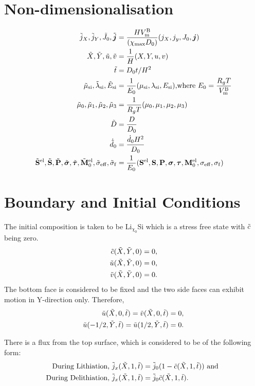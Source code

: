 \section{Non-dimensionalisation}
\begin{align}
    \tilde{j}_X, \tilde{j}_Y, \tilde{J}_0, \tilde{\bm{j}} &=  \frac{H V_{\rm{m}}^{\rm{B}}}{(\chi_{{\rm{max}}} D_0)} (j_X, j_y, J_0, \bm{j}) \\
    \tilde{X}, \tilde{Y}, \tilde{u}, \tilde{v} &= \frac{1}{H}(X, Y, u, v) \\
    \tilde{t} &= D_0 t/H^2 \\
     \tilde{\mu}_{\text{si}}, \tilde{\lambda}_{\text{si}}, \tilde{E}_{\text{si}} &= \frac{1}{E_0} (\mu_{\text{si}}, \lambda_{\text{si}}, E_{\text{si}}) 
     \text{,where }  E_0 = \frac{R_g T}{V_{\rm{m}}^{\rm{B}}} \\
     \tilde{\mu}_0, \tilde{\mu}_1, \tilde{\mu}_2, \tilde{\mu}_3 &= \frac{1}{R_g T}(\mu_0, \mu_1, \mu_2, \mu_3) \\
     \tilde{D} &= \frac{D}{D_0} \\
     \dot{\tilde{d}}_{0} &= \frac{{\dot{d}}_0 H^2}{D_0} \\
     \tilde{\mathbf{S}}^{{\rm{el}}}, \tilde{\mathbf{S}}, \tilde{\mathbf{P}}, \tilde{\bm{\sigma}}, \tilde{\bm{\tau}}, \tilde{\mathbf{M}}^{{\rm{el}}}_{0}, \tilde{\sigma}_{\rm{eff}}, \tilde{\sigma}_{\rm{f}} &= \frac{1}{E_0}(\mathbf{S}^{{\rm{el}}}, \mathbf{S}, \mathbf{P}, \bm{\sigma}, \bm{\tau}, \mathbf{M}^{{\rm{el}}}_{0}, \sigma_{\rm{eff}}, \sigma_{\rm{f}})
\end{align}


\section{Boundary and Initial Conditions}
The initial composition is taken to be Li$_{\chi_{0}}$Si which is a stress free state with $\tilde{c}$ being zero.
\begin{align}
    \tilde{c}(\tilde{X}, \tilde{Y}, 0) = 0, \\
    \tilde{u}(\tilde{X}, \tilde{Y}, 0) = 0,\\
    \tilde{v}(\tilde{X}, \tilde{Y}, 0) = 0.
\end{align}
\clearpage
The bottom face is considered to be fixed and the two side faces can exhibit motion in Y-direction only. Therefore,
\begin{align}
    \tilde{u}(\tilde{X}, 0, \tilde{t}) = \tilde{v}(\tilde{X}, 0, \tilde{t}) = 0, \\
    \tilde{u}(-1/2, \tilde{Y}, \tilde{t}) =  \tilde{u}(1/2, \tilde{Y}, \tilde{t}) = 0.
\end{align}

There is a flux from the top surface, which is considered to be of the following form: 
\begin{align}
    \text{During Lithiation, }\tilde{j}_x(\tilde{X}, 1, \tilde{t}) &= \tilde{j}_0 (1 - \tilde{c}(\tilde{X}, 1, \tilde{t})) \text{ and } \\
    \text{During Delithiation, }\tilde{j}_x(\tilde{X}, 1, \tilde{t}) &= \tilde{j}_0 \tilde{c}(\tilde{X}, 1, \tilde{t}).
\end{align} 

